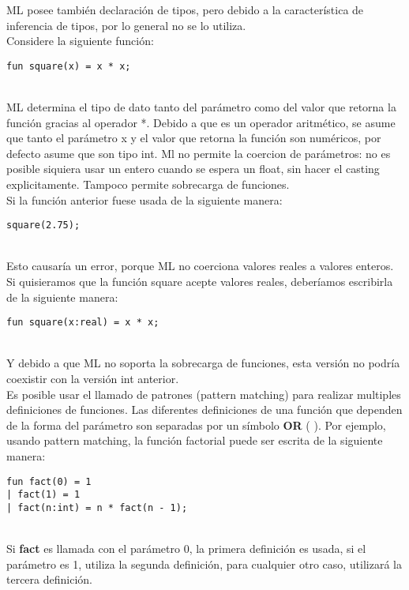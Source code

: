 \documentclass[11pt]{article} %
\begin{document}
ML posee también declaración de tipos, pero debido a la característica de inferencia de tipos, por lo general no se lo utiliza.\\Considere la siguiente función:\\
\begin{lstlisting}[frame=single]
fun square(x) = x * x;
\end{lstlisting}
\\
ML determina el tipo de dato tanto del parámetro como del valor que retorna la función gracias al operador *. Debido a que es un operador aritmético, se asume que tanto el parámetro x y el valor que retorna la función son numéricos, por defecto asume que son tipo int. 
Ml no permite la coercion de parámetros: no es posible siquiera usar un entero cuando se espera un float, sin hacer el casting explicitamente. Tampoco permite sobrecarga de funciones.\\
Si la función anterior fuese usada de la siguiente manera:\\
\begin{lstlisting}[frame=single]
square(2.75);
\end{lstlisting}
\\
Esto causaría un error, porque ML no coerciona valores reales a valores enteros. Si quisieramos que la función square acepte valores reales, deberíamos escribirla de la siguiente manera:\\
\begin{lstlisting}[frame=single]
fun square(x:real) = x * x;
\end{lstlisting}\\

Y debido a que ML no soporta la sobrecarga de funciones, esta versión no podría coexistir con la versión int anterior.\\

Es posible usar el llamado de patrones (pattern matching) para realizar multiples definiciones de funciones. Las diferentes definiciones de una función que dependen de la forma del parámetro son separadas por un símbolo {\bf OR} ( \textbar ). Por ejemplo, usando pattern matching, la función factorial puede ser escrita de la siguiente manera: \\
\begin{lstlisting}[frame = single]
fun fact(0) = 1
| fact(1) = 1
| fact(n:int) = n * fact(n - 1);
\end{lstlisting}\\

Si {\bf fact} es llamada con el parámetro 0, la primera definición es usada, si el parámetro es 1, utiliza la segunda definición, para cualquier otro caso, utilizará la tercera definición.
\end{document}
